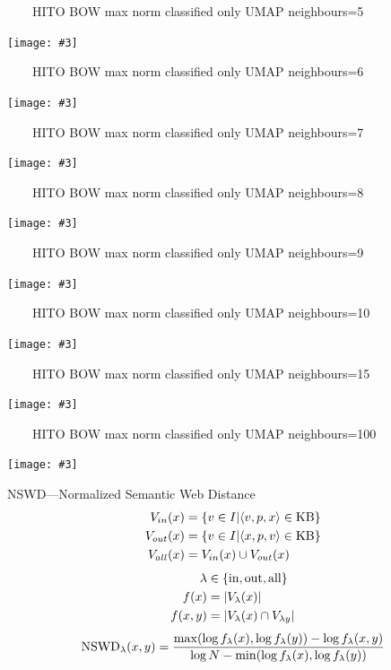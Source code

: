 \documentclass[aspectratio=1610]{beamer}%
\newcommand{\f}[1]{\ensuremath{f(#1)}}
\newcommand{\fl}[1]{\ensuremath{f_{\lambda}(#1)}}
\newcommand{\imageslide}[4][]
{
\begin{frame}[plain]{~~~~#2}
\vspace{0.2em}
\begin{center}
\centering\texttt{[image: \#3]}
\end{center}
#1
\note{#4}
\end{frame}
}
\begin{document}
\imageslide{HITO BOW max norm classified only UMAP neighbours=5}{img/cluster-bagofwords-classifiedonly-umap-n5-max.pdf}{}
\imageslide{HITO BOW max norm classified only UMAP neighbours=6}{img/cluster-bagofwords-classifiedonly-umap-n6-max.pdf}{}
\imageslide{HITO BOW max norm classified only UMAP neighbours=7}{img/cluster-bagofwords-classifiedonly-umap-n7-max.pdf}{}
\imageslide{HITO BOW max norm classified only UMAP neighbours=8}{img/cluster-bagofwords-classifiedonly-umap-n8-max.pdf}{}
\imageslide{HITO BOW max norm classified only UMAP neighbours=9}{img/cluster-bagofwords-classifiedonly-umap-n9-max.pdf}{}
\imageslide{HITO BOW max norm classified only UMAP neighbours=10}{img/cluster-bagofwords-classifiedonly-umap-n10-max.pdf}{}
\imageslide{HITO BOW max norm classified only UMAP neighbours=15}{img/cluster-bagofwords-classifiedonly-umap-max.pdf}{}
\imageslide{HITO BOW max norm classified only UMAP neighbours=100}{img/cluster-bagofwords-classifiedonly-umap-n100-max.pdf}{}

\begin{frame}{NSWD---Normalized Semantic Web Distance~\cite{normalizedsemanticwebdistance}}
\begin{align*}
V_{in}(x)	&= \{v \in I| \langle v,p,x \rangle \in \textnormal{KB}\}\\
V_{out}(x)	&= \{v \in I| \langle x,p,v \rangle \in \textnormal{KB}\}\\
V_{all}(x)	&= V_{in}(x) \cup V_{out}(x)
\end{align*}
\begin{align*}
\lambda		&\in \{\textnormal{in}, \textnormal{out}, \textnormal{all}\}\\
\f{x}		&= |V_{\lambda}(x)|\\
\f{x,y}	&= |V_{\lambda}(x) \cap V_{\lambda{y}}|
\end{align*}
\[
\textnormal{NSWD}_{\lambda}(x,y) = \frac{\max(\log \fl{x}, \log \fl{y})- \log \fl{x,y}}{\log N - \min(\log \fl{x}, \log \fl{y})}
\]
\end{frame}

\end{document}
